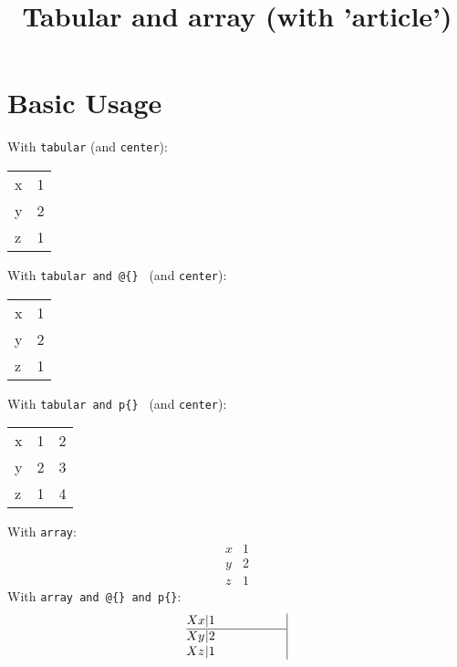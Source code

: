 \documentclass{article}
\title{Tabular and array (with 'article')}
\begin{document}
\maketitle

\section{Basic Usage}


        With \verb|tabular| (and \verb|center|):
        \begin{center}
            \begin{tabular}{lr}
                x & 1 \\
                y & 2 \\
                z & 1
            \end{tabular}
        \end{center}
        
        With \verb|tabular and @{} | (and \verb|center|):
        \begin{center}
            \begin{tabular}{@{}l@{ }r@{.}}
             x & 1 \\
             y & 2 \\
             z & 1
            \end{tabular}
            \end{center}

    With \verb|tabular and p{} | (and \verb|center|):
        \begin{center}
            \begin{tabular}{|p{1cm}|p{2cm}|p{3cm}|}
             x & 1 & 2\\
             y & 2 & 3\\
             z & 1 & 4
            \end{tabular}
        \end{center}

    With \verb|array|:
        $$
        \begin{array}{l|r}
         x & 1 \\
         \hline
         y & 2 \\
         z & 1
        \end{array}
        $$
    With \verb|array and @{} and p{}|:
        $$
        \begin{array}{@{X }l@{|}p{2cm}|}
         x & 1 \\
         \hline
         y & 2 \\
         z & 1
        \end{array}
        $$
        
    
\end{document}
